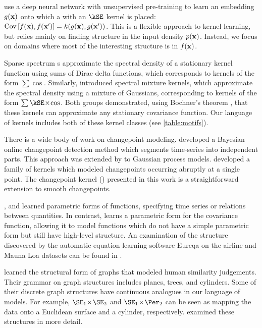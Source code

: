 \citet{salakhutdinov2008using} use a deep neural network with unsupervised pre-training to learn an embedding $g({\bf{x}})$ onto which a \gp{} with an $\kSE$ kernel is placed: ${\operatorname{Cov}{[f({\bf{x}}), f({\bf{x}}')]} = k(g({\bf{x}}), g({\bf{x}}'))}$.
This is a flexible approach to kernel learning, but relies mainly on finding structure in the input density $p({\bf{x}})$.
Instead, we focus on domains where most of the interesting structure is in $f({\bf{x}})$.

Sparse spectrum \gp{}s \citep{lazaro2010sparse} approximate the spectral density of a stationary kernel function using sums of Dirac delta functions, which corresponds to kernels of the form $\sum \cos$.
Similarly, \citet{WilAda13} introduced spectral mixture kernels, which approximate the spectral density using a mixture of Gaussians, corresponding to kernels of the form $\sum \kSE \kerntimes \cos$.
Both groups demonstrated, using Bochner's theorem \citep{bochner1959lectures}, that these kernels can approximate any stationary covariance function.
Our language of kernels includes both of these kernel classes (see \cref{table:motifs}).



There is a wide body of work on changepoint modeling.
\citet{adams2007bayesian} developed a Bayesian online changepoint detection method which segments time-series into independent parts.
This approach was extended by \citet{saatcci2010gaussian} to Gaussian process models.
\citet{garnett2010sequential} developed a family of kernels which modeled changepoints occurring abruptly at a single point.
The changepoint kernel (\kCP) presented in this work is a straightforward extension to smooth changepoints.


\cite{todorovski1997declarative}, \cite{washio1999discovering} and \cite{Schmidt2009b} learned parametric forms of functions, specifying time series or relations between quantities.
In contrast, \procedurename{} learns a parametric form for the covariance function, allowing it to model functions which do not have a simple parametric form but still have high-level structure.
An examination of the structure discovered by the automatic equation-learning software Eureqa \citep{Eureqa} on the airline and Mauna Loa datasets can be found in \citet{LloDuvGroetal14}.




\citet{kemp2008discovery} learned the structural form of graphs that modeled human similarity judgements.
Their grammar on graph structures includes planes, trees, and cylinders.
Some of their discrete graph structures have continuous analogues in our language of models.
For example, $\SE_1 \kerntimes \SE_2$ and $\SE_1 \kerntimes \Per_2$ can be seen as mapping the data onto a Euclidean surface and a cylinder, respectively.
 examined these structures in more detail.

